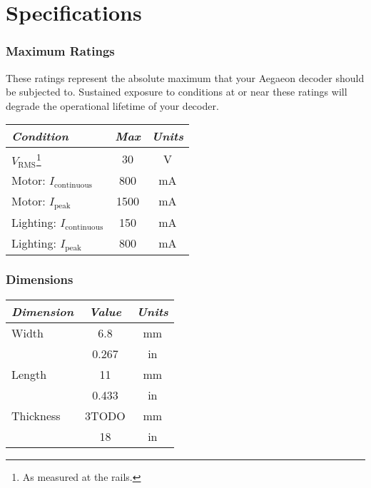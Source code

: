 \documentclass[12pt,letterpaper,draft]{memoir} %
\begin{document}
\chapter{Specifications}

\subsection*{Maximum Ratings}

These ratings represent the absolute maximum that your Aegaeon decoder should be subjected to. Sustained exposure to conditions at or near these ratings will degrade the operational lifetime of your decoder.

\begin{center}
\begin{longtable}{|l|c|c|}
\hline
\textit{Condition} & \textit{Max} & \textit{Units}\\ \hline
$V_{\mathrm{RMS}}$\footnote{As measured at the rails.} & 30 & V \\ \hline
Motor: $I_{\mathrm{continuous}}$ & 800 & mA \\ \hline
Motor: $I_{\mathrm{peak}}$ & 1500 & mA \\ \hline
Lighting: $I_{\mathrm{continuous}}$ & 150 & mA \\ \hline
Lighting: $I_{\mathrm{peak}} $ & 800 & mA \\ \hline
\end{longtable}
\end{center}

\subsection*{Dimensions}

\begin{center}
\begin{tabular}{|l|c|c|}
\hline
\textit{Dimension} & \textit{Value} & \textit{Units}\\ \hline
Width & 6.8 & mm \\
       &0.267 & in \\ \hline
Length & 11 & mm \\
       & 0.433 & in \\ \hline
Thickness & 3TODO & mm \\
          & 18 & in \\ \hline
\end{tabular}
\end{center}
\end{document}
